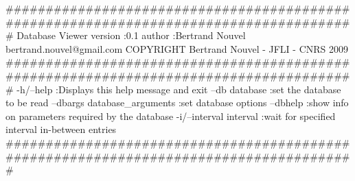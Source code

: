 #######################################################################################
Database Viewer
version :0.1
author :Bertrand Nouvel bertrand.nouvel@gmail.com
        COPYRIGHT Bertrand Nouvel - JFLI - CNRS 2009
#######################################################################################
	-h/--help 		:Displays this help message and exit
	--db database		:set the database to be read
	--dbargs database_arguments		:set database options
	--dbhelp 		:show info on parameters required by the database
	-i/--interval interval		:wait for specified interval in-between entries
#######################################################################################
